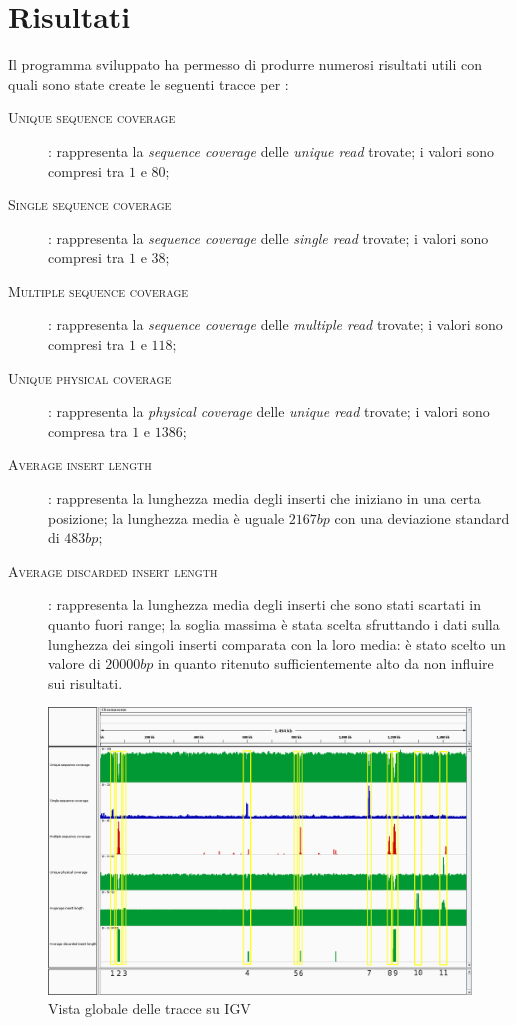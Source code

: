 \clearpage
\section{Risultati}
Il programma sviluppato ha permesso di produrre numerosi risultati utili con quali sono state create le seguenti tracce per :
\begin{description}
\item[\textsc{Unique sequence coverage}]: rappresenta la \emph{sequence coverage} delle \emph{unique read} trovate; i valori sono compresi tra $1$ e $80$;
\item[\textsc{Single sequence coverage}]: rappresenta la \emph{sequence coverage} delle \emph{single read} trovate; i valori sono compresi tra $1$ e $38$;
\item[\textsc{Multiple sequence coverage}]: rappresenta la \emph{sequence coverage} delle \emph{multiple read} trovate; i valori sono compresi tra $1$ e $118$;
\item[\textsc{Unique physical coverage}]: rappresenta la \emph{physical coverage} delle \emph{unique read} trovate; i valori sono compresa tra $1$ e $1386$;
\item[\textsc{Average insert length}]: rappresenta la lunghezza media degli inserti che iniziano in una certa posizione; la lunghezza media è uguale $2167 bp$ con una deviazione standard di $483 bp$;
\item[\textsc{Average discarded insert length}]: rappresenta la lunghezza media degli inserti che sono stati scartati in quanto fuori range; la soglia massima è stata scelta sfruttando i dati sulla lunghezza dei singoli inserti comparata con la loro media: è stato scelto un valore di $20000 bp$ in quanto ritenuto sufficientemente alto da non influire sui risultati.
\end{description}

\begin{figure}[htbp]
\centering
\includegraphics[width=\textwidth]{immagini/igv_global.png}
\caption{Vista globale delle tracce su IGV}
\label{fig:igv globale}
\end{figure}

